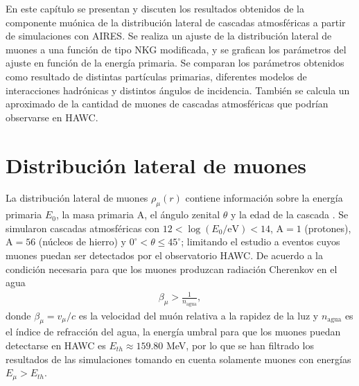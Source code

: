\vspace{-5mm}
En este cap\'itulo se presentan y discuten los resultados obtenidos de la componente mu\'onica de la distribuci\'on lateral de cascadas atmosf\'ericas a partir de simulaciones con AIRES. Se realiza un ajuste de la distribuci\'on lateral de muones a una funci\'on de tipo NKG modificada, y se grafican los par\'ametros del ajuste en funci\'on de la energ\'ia primaria. Se comparan los par\'ametros obtenidos como resultado de distintas part\'iculas primarias, diferentes modelos de interacciones hadr\'onicas y distintos \'angulos de incidencia. Tambi\'en se calcula un aproximado de la cantidad de muones de cascadas atmosf\'ericas que podr\'ian observarse en HAWC.

\section{Distribuci\'on lateral de muones}	
La distribuci\'on lateral de muones $\rho_{\mu}(r)$ contiene informaci\'on sobre la energ\'ia primaria $E_0$, la masa primaria A, el \'angulo zenital $\theta$ y la edad de la cascada \cite{Albrecht2021}. Se simularon cascadas atmosf\'ericas con $12 < \log(E_0/\text{eV}) < 14$, A$=1$ (protones), A$=56$ (n\'ucleos de hierro) y $0^{\circ} < \theta \leq 45^{\circ}$; limitando el estudio a eventos cuyos muones puedan ser detectados por el observatorio HAWC. De acuerdo a la condici\'on necesaria para que los muones produzcan radiaci\'on Cherenkov en el agua
	\begin{align}
	\beta_{\mu} > \frac{1}{n_{\text{agua}}},
	\end{align}
donde $\beta_{\mu}=v_{\mu}/c$ es la velocidad del mu\'on relativa a la rapidez de la luz y $n_{\text{agua}}$ es el \'indice de refracci\'on del agua, la energ\'ia umbral para que los muones puedan detectarse en HAWC es $E_{th}\approx 159.80$ MeV, por lo que se han filtrado los resultados de las simulaciones tomando en cuenta solamente muones con energ\'ias $E_{\mu} > E_{th}$. \\
	
